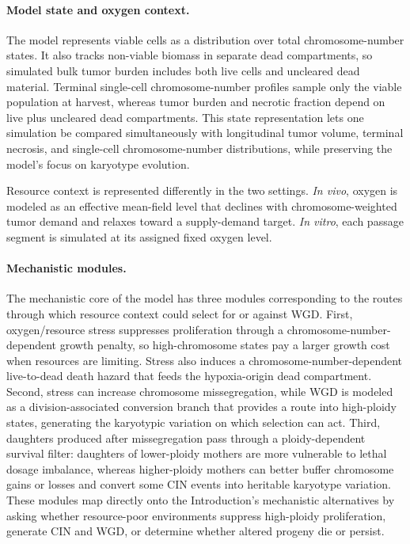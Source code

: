 \documentclass[11pt]{article}
\begin{document}
\paragraph{Model state and oxygen context.}
The model represents viable cells as a distribution over total chromosome-number states. It also tracks non-viable biomass in separate dead compartments, so simulated bulk tumor burden includes both live cells and uncleared dead material. Terminal single-cell chromosome-number profiles sample only the viable population at harvest, whereas tumor burden and necrotic fraction depend on live plus uncleared dead compartments. This state representation lets one simulation be compared simultaneously with longitudinal tumor volume, terminal necrosis, and single-cell chromosome-number distributions, while preserving the model's focus on karyotype evolution.

Resource context is represented differently in the two settings. \textit{In vivo}, oxygen is modeled as an effective mean-field level that declines with chromosome-weighted tumor demand and relaxes toward a supply-demand target. \textit{In vitro}, each passage segment is simulated at its assigned fixed oxygen level.

\paragraph{Mechanistic modules.}
The mechanistic core of the model has three modules corresponding to the routes through which resource context could select for or against WGD. First, oxygen/resource stress suppresses proliferation through a chromosome-number-dependent growth penalty, so high-chromosome states pay a larger growth cost when resources are limiting. Stress also induces a chromosome-number-dependent live-to-dead death hazard that feeds the hypoxia-origin dead compartment. Second, stress can increase chromosome missegregation, while WGD is modeled as a division-associated conversion branch that provides a route into high-ploidy states, generating the karyotypic variation on which selection can act. Third, daughters produced after missegregation pass through a ploidy-dependent survival filter: daughters of lower-ploidy mothers are more vulnerable to lethal dosage imbalance, whereas higher-ploidy mothers can better buffer chromosome gains or losses and convert some CIN events into heritable karyotype variation. These modules map directly onto the Introduction's mechanistic alternatives by asking whether resource-poor environments suppress high-ploidy proliferation, generate CIN and WGD, or determine whether altered progeny die or persist.
\end{document}
